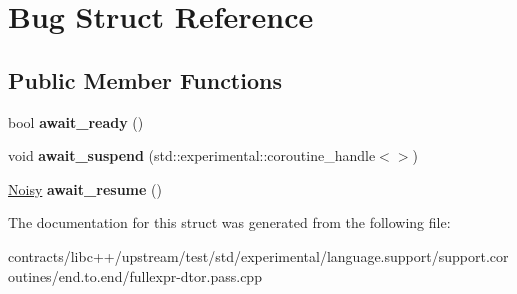 \hypertarget{struct_bug}{}\section{Bug Struct Reference}
\label{struct_bug}
\subsection*{Public Member Functions}
\begin{DoxyCompactItemize}
\item 
\mbox{\label{struct_bug_a1731bfcb49afed27948fa278e246f0e1}} 
bool {\bfseries await\+\_\+ready} ()
\item 
\mbox{\label{struct_bug_adfe5392580389cfcd07252183ce19d7d}} 
void {\bfseries await\+\_\+suspend} (std\+::experimental\+::coroutine\+\_\+handle$<$$>$)
\item 
\mbox{\label{struct_bug_a8b26220cead708b9db5909ad12e879fa}} 
\mbox{\hyperlink{struct_noisy}{Noisy}} {\bfseries await\+\_\+resume} ()
\end{DoxyCompactItemize}


The documentation for this struct was generated from the following file\+:\begin{DoxyCompactItemize}
\item 
contracts/libc++/upstream/test/std/experimental/language.\+support/support.\+coroutines/end.\+to.\+end/fullexpr-\/dtor.\+pass.\+cpp\end{DoxyCompactItemize}

